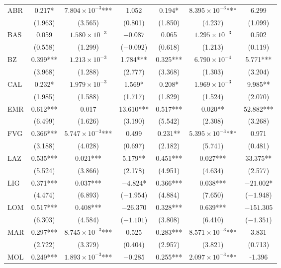 \documentclass[12pt]{article}
\begin{document}
\begin{appendices}
\begin{longtable}{@{}lcccccc@{}}
            ABR & 0.217* & $7.804 \times 10^{-3}$*** & 1.052 & 0.194* & $8.395 \times 10^{-3}$*** & 6.299 \\ 
             & (1.963) & (3.565) & (0.801) & (1.850) & (4.237) & (1.099) \\ 
            BAS & 0.059 & $1.580 \times 10^{-3}$ & $-0.087$ & 0.065 & $1.295 \times 10^{-3}$ & 0.502 \\ 
             & (0.558) & (1.299) & ($-0.092$) & (0.618) & (1.213) & (0.119) \\ 
            BZ & 0.399*** & $1.213 \times 10^{-3}$ & 1.784*** & 0.325*** & $6.790 \times 10^{-4}$ & 5.771*** \\ 
             & (3.968) & (1.288) & (2.777) & (3.368) & (1.303) & (3.204) \\ 
            CAL & 0.232* & $1.979 \times 10^{-3}$ & 1.569* & 0.208* & $1.969 \times 10^{-3}$ & 9.985** \\ 
             & (1.985) & (1.588) & (1.717) & (1.829) & (1.524) & (2.070) \\ 
            EMR & 0.612*** & 0.017 & 13.610*** & 0.517*** & 0.020** & 52.882*** \\ 
             & (6.499) & (1.626) & (3.190) & (5.542) & (2.308) & (3.268) \\ 
            FVG & 0.366*** & $5.747 \times 10^{-3}$*** & 0.499 & 0.231** & $5.395 \times 10^{-3}$*** & 0.971 \\ 
             & (3.188) & (4.028) & (0.697) & (2.182) & (5.741) & (0.481) \\ 
            LAZ & 0.535*** & 0.021*** & 5.179** & 0.451*** & 0.027*** & 33.375** \\ 
             & (5.524) & (3.866) & (2.178) & (4.951) & (4.634) & (2.577) \\ 
            LIG & 0.371*** & 0.037*** & $-4.824$* & 0.366*** & 0.038*** & $-21.002$* \\ 
             & (4.474) & (6.893) & ($-1.954$) & (4.884) & (7.650) & ($-1.948$) \\ 
            LOM & 0.517*** & 0.408*** & $-26.370$ & 0.328*** & 0.639*** & $-151.305$ \\ 
             & (6.303) & (4.584) & ($-1.101$) & (3.808) & (6.410) & ($-1.351$) \\ 
            MAR & 0.297*** & $8.745 \times 10^{-3}$*** & 0.525 & 0.283*** & $8.571 \times 10^{-3}$*** & 3.831 \\ 
             & (2.722) & (3.379) & (0.404) & (2.957) & (3.821) & (0.713) \\ 
            MOL & 0.249*** & $1.893 \times 10^{-3}$*** & $-0.285$ & 0.255*** & $2.097 \times 10^{-3}$*** & -1.396 \\ 

\end{longtable}
\end{appendices}
\end{document}
